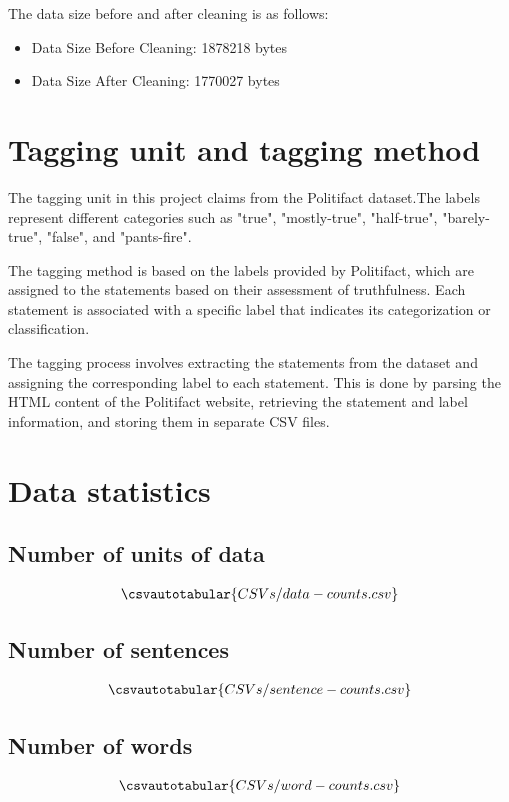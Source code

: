 \documentclass[12pt]{article}
\begin{document}
The data size before and after cleaning is as follows:

\begin{itemize}
  \item Data Size Before Cleaning: 1878218 bytes
  \item Data Size After Cleaning: 1770027 bytes
\end{itemize}

\section{Tagging unit and tagging method}

The tagging unit in this project claims from the Politifact dataset.The labels represent different categories such as "true", "mostly-true", "half-true", "barely-true", "false", and "pants-fire".

The tagging method is based on the labels provided by Politifact, which are assigned to the statements based on their assessment of truthfulness. Each statement is associated with a specific label that indicates its categorization or classification.

The tagging process involves extracting the statements from the dataset and assigning the corresponding label to each statement. This is done by parsing the HTML content of the Politifact website, retrieving the statement and label information, and storing them in separate CSV files.

\section{Data statistics}
\subsection{Number of units of data}
\begin{align*}
    \csvautotabular{CSVs/data-counts.csv}
\end{align*}

\subsection{Number of sentences}
\begin{align*}
    \csvautotabular{CSVs/sentence-counts.csv}
\end{align*}

\subsection{Number of words}
\begin{align*}
    \csvautotabular{CSVs/word-counts.csv}
\end{align*}
\end{document}
